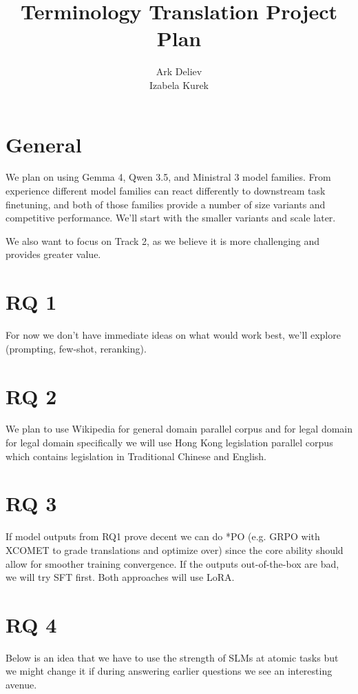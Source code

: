 \documentclass[11pt]{article}
\title{Terminology Translation Project Plan}
\author{Ark Deliev \\ Izabela Kurek}
\begin{document}
\maketitle

\section{General}

We plan on using Gemma 4, Qwen 3.5, and Ministral 3 model families. From experience different model families can react differently to downstream task finetuning, and both of those families provide a number of size variants and competitive performance. We'll start with the smaller variants and scale later.

We also want to focus on Track 2, as we believe it is more challenging and provides greater value.

\section{RQ 1}

For now we don't have immediate ideas on what would work best, we'll explore (prompting, few-shot, reranking).

\section{RQ 2}

We plan to use Wikipedia for general domain parallel corpus and for legal domain for legal domain specifically we will use
Hong Kong legislation parallel corpus which contains legislation in Traditional Chinese and English.

\section{RQ 3}

If model outputs from RQ1 prove decent we can do *PO (e.g. GRPO with XCOMET to grade translations and optimize over) since the core ability should allow for smoother training convergence. If the outputs out-of-the-box are bad, we will try SFT first. Both approaches will use LoRA.

\section{RQ 4}

Below is an idea that we have to use the strength of SLMs at atomic tasks but we might change it if during answering earlier questions we see an interesting avenue.
\end{document}
